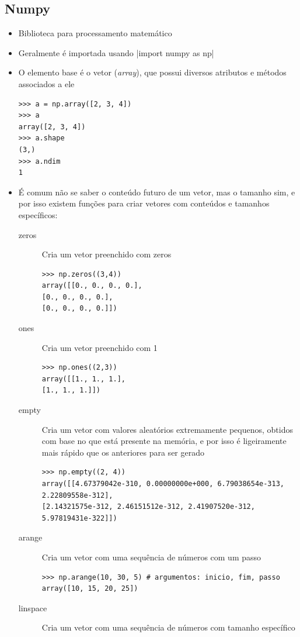 \subsection{Numpy}
\begin{itemize}
	\item Biblioteca para processamento matemático~\cite{harris_array_2020}
	\item Geralmente é importada usando |import numpy as np|
	\item O elemento base é o vetor (\textit{array}), que possui diversos atributos e métodos associados a ele
	\begin{verbatim}
>>> a = np.array([2, 3, 4])
>>> a
array([2, 3, 4])
>>> a.shape
(3,)
>>> a.ndim
1
	\end{verbatim}
	\item É comum não se saber o conteúdo futuro de um vetor, mas o tamanho sim, e por isso existem funções para criar vetores com conteúdos e tamanhos específicos:
	\begin{description}
		\item[zeros] Cria um vetor preenchido com zeros
		\begin{verbatim}
>>> np.zeros((3,4))
array([[0., 0., 0., 0.],
[0., 0., 0., 0.],
[0., 0., 0., 0.]])
		\end{verbatim}
		\item[ones] Cria um vetor preenchido com 1
		\begin{verbatim}
>>> np.ones((2,3))
array([[1., 1., 1.],
[1., 1., 1.]])
		\end{verbatim}
		\item[empty] Cria um vetor com valores aleatórios extremamente pequenos, obtidos com base no que está presente na memória, e por isso é ligeiramente mais rápido que os anteriores para ser gerado
		\begin{verbatim}
>>> np.empty((2, 4))
array([[4.67379042e-310, 0.00000000e+000, 6.79038654e-313,
2.22809558e-312],
[2.14321575e-312, 2.46151512e-312, 2.41907520e-312,
5.97819431e-322]])
		\end{verbatim}
		\item[arange] Cria um vetor com uma sequência de números com um passo
		\begin{verbatim}
>>> np.arange(10, 30, 5) # argumentos: inicio, fim, passo
array([10, 15, 20, 25])
		\end{verbatim}
		\item[linspace] Cria um vetor com uma sequência de números com tamanho específico
		\begin{verbatim}

\end{verbatim}
\end{description}
\end{itemize}
